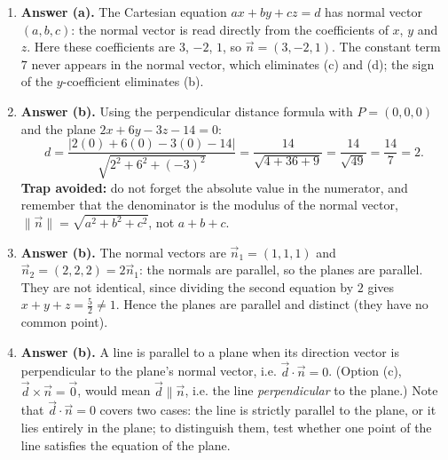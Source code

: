 \documentclass[11pt]{article}
\newcommand{\cle}[1]{{\popxbold\color{popdark}#1}}
\begin{document}
\begin{corrige}
\begin{enumerate}
\item \textbf{Answer (a).} The Cartesian equation $ax+by+cz=d$ has normal vector $(a,b,c)$: the normal vector is read directly from the coefficients of $x$, $y$ and $z$. Here these coefficients are $3$, $-2$, $1$, so $\vec{n}=(3,-2,1)$. The constant term $7$ never appears in the normal vector, which eliminates (c) and (d); the sign of the $y$-coefficient eliminates (b).

\item \textbf{Answer (b).} Using the perpendicular distance formula with $P=(0,0,0)$ and the plane $2x+6y-3z-14=0$:
\[
d=\dfrac{|2(0)+6(0)-3(0)-14|}{\sqrt{2^{2}+6^{2}+(-3)^{2}}}=\dfrac{14}{\sqrt{4+36+9}}=\dfrac{14}{\sqrt{49}}=\dfrac{14}{7}=2.
\]
\textbf{Trap avoided:} do not forget the absolute value in the numerator, and remember that the denominator is the modulus of the normal vector, $\|\vec{n}\|=\sqrt{a^{2}+b^{2}+c^{2}}$, not $a+b+c$.

\item \textbf{Answer (b).} The normal vectors are $\vec{n}_1=(1,1,1)$ and $\vec{n}_2=(2,2,2)=2\vec{n}_1$: the normals are parallel, so the planes are parallel. They are not identical, since dividing the second equation by $2$ gives $x+y+z=\tfrac{5}{2}\neq 1$. Hence the planes are \cle{parallel and distinct} (they have no common point).

\item \textbf{Answer (b).} A line is parallel to a plane when its direction vector is perpendicular to the plane's normal vector, i.e. $\vec{d}\cdot\vec{n}=0$. (Option (c), $\vec{d}\times\vec{n}=\vec{0}$, would mean $\vec{d}\parallel\vec{n}$, i.e. the line \emph{perpendicular} to the plane.) Note that $\vec{d}\cdot\vec{n}=0$ covers two cases: the line is strictly parallel to the plane, or it lies entirely in the plane; to distinguish them, test whether one point of the line satisfies the equation of the plane.
\end{enumerate}
\end{corrige}
\end{document}
